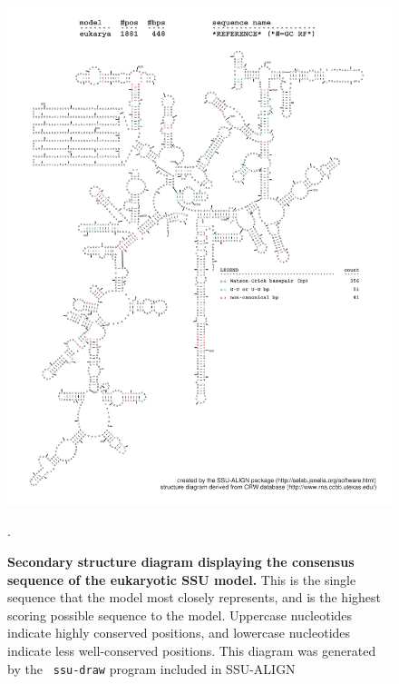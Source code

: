 \newpage 
\begin{figure}
\begin{center}
\includegraphics[width=5.7in]{Figures/eukarya-0p1-rf}
\end{center}
\caption[Secondary structure diagram displaying the consensus sequence
  of the eukaryotic SSU model]{\textbf{Secondary structure diagram displaying the
  consensus sequence of the eukaryotic SSU model.} 
  This is the single sequence that the model 
  most closely represents, and is the highest scoring possible
  sequence to the model. Uppercase nucleotides indicate highly conserved positions,
  and lowercase nucleotides indicate less well-conserved positions.
  This diagram was generated by the {\tt
  ssu-draw} program included in SSU-ALIGN}.
\label{fig:eukrf}
\end{figure}

\newpage 


